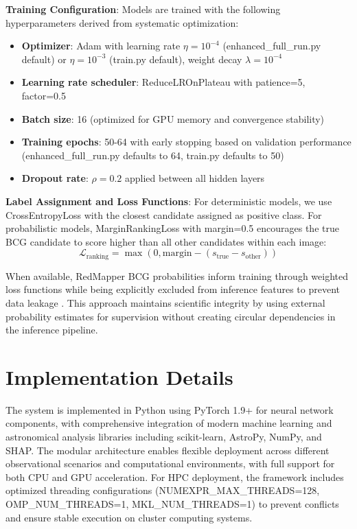\documentclass[twocolumn,10pt]{aastex631}
\begin{document}
\textbf{Training Configuration}: Models are trained with the following hyperparameters derived from systematic optimization:
\begin{itemize}
\item \textbf{Optimizer}: Adam with learning rate $\eta = 10^{-4}$ (enhanced\_full\_run.py default) or $\eta = 10^{-3}$ (train.py default), weight decay $\lambda = 10^{-4}$
\item \textbf{Learning rate scheduler}: ReduceLROnPlateau with patience=5, factor=0.5
\item \textbf{Batch size}: 16 (optimized for GPU memory and convergence stability)
\item \textbf{Training epochs}: 50-64 with early stopping based on validation performance (enhanced\_full\_run.py defaults to 64, train.py defaults to 50)
\item \textbf{Dropout rate}: $\rho = 0.2$ applied between all hidden layers
\end{itemize}

\textbf{Label Assignment and Loss Functions}: For deterministic models, we use CrossEntropyLoss with the closest candidate assigned as positive class. For probabilistic models, MarginRankingLoss with margin=0.5 encourages the true BCG candidate to score higher than all other candidates within each image:
\begin{equation}
\mathcal{L}_{\text{ranking}} = \max(0, \text{margin} - (s_{\text{true}} - s_{\text{other}}))
\end{equation}

When available, RedMapper BCG probabilities inform training through weighted loss functions while being explicitly excluded from inference features to prevent data leakage \citep{Rykoff2014redMaPPer}. This approach maintains scientific integrity by using external probability estimates for supervision without creating circular dependencies in the inference pipeline.

\section{Implementation Details}

The system is implemented in Python using PyTorch 1.9+ for neural network components, with comprehensive integration of modern machine learning and astronomical analysis libraries including scikit-learn, AstroPy, NumPy, and SHAP. The modular architecture enables flexible deployment across different observational scenarios and computational environments, with full support for both CPU and GPU acceleration. For HPC deployment, the framework includes optimized threading configurations (NUMEXPR\_MAX\_THREADS=128, OMP\_NUM\_THREADS=1, MKL\_NUM\_THREADS=1) to prevent conflicts and ensure stable execution on cluster computing systems.
\end{document}
